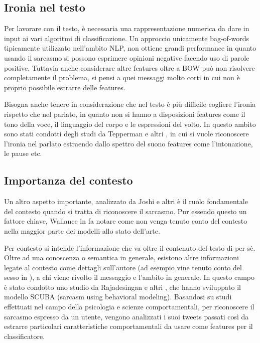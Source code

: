 \documentclass[oneside]{book}
\begin{document}
\subsection{Ironia nel testo}
Per lavorare con il testo, è necessaria una rappresentazione numerica da dare in input ai vari algoritmi di classificazione. Un approccio unicamente bag-of-words tipicamente utilizzato nell'ambito NLP, non ottiene grandi performance in quanto usando il sarcasmo si possono esprimere opinioni negative facendo uso di parole positive. Tuttavia anche considerare altre features oltre a BOW può non risolvere completamente il problema, si pensi a quei messaggi molto corti in cui non è proprio possibile estrarre delle features.

Bisogna anche tenere in considerazione che nel testo è più difficile cogliere l'ironia rispetto che nel parlato, in quanto non si hanno a disposizioni features come il tono della voce, il linguaggio del corpo e le espressioni del volto. In questo ambito sono stati condotti degli studi da Tepperman e altri \cite{audio-sarcasm}, in cui si vuole riconoscere l'ironia nel parlato estraendo dallo spettro del suono features come l'intonazione, le pause etc.


\subsection{Importanza del contesto}
Un altro aspetto importante, analizzato da Joshi e altri \cite{survey5} è il ruolo fondamentale del contesto quando si tratta di riconoscere il sarcasmo. Pur essendo questo un fattore chiave, Wallance in \cite{survey4} fa notare come non venga tenuto conto del contesto nella maggior parte dei modelli allo stato dell'arte.

Per contesto si intende l'informazione che va oltre il contenuto del testo di per sè. Oltre ad una conoscenza o semantica in generale, esistono altre informazioni legate al contesto come dettagli sull'autore (ad esempio vine tenuto conto del sesso in \cite{audio-sarcasm}), a chi viene rivolto il messaggio e l'ambito in generale. In questo campo è stato condotto uno studio da Rajadesingan e altri \cite{scuba}, che hanno sviluppato il modello SCUBA (sarcasm using behavioral modeling). Basandosi su studi effettuati nel campo della psicologia e scienze comportamentali, per riconoscere il sarcasmo espresso da un utente, vengono analizzati i suoi tweets passati così da estrarre particolari caratteristiche comportamentali da usare come features per il classificatore.
\end{document}
